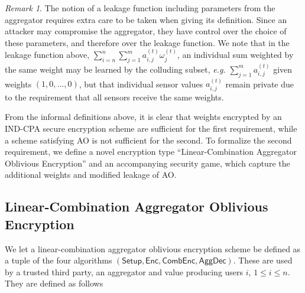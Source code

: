 \documentclass[10pt,letterpaper,oneside,twocolumn,journal]{IEEEtran}
\theoremstyle{definition}
\theoremstyle{definition}
\theoremstyle{remark}
\newtheorem*{remark}{Remark}
\begin{document}
\begin{remark} \label{rem:lcao_leakage}
    The notion of a leakage function including parameters from the aggregator requires extra care to be taken when giving its definition. Since an attacker may compromise the aggregator, they have control over the choice of these parameters, and therefore over the leakage function. We note that in the leakage function above, $\sum^n_{i=n}\sum^m_{j=1}a^{(t)}_{i,j}\omega^{(t)}_j$, an individual sum weighted by the same weight may be learned by the colluding subset, \textit{e.g.} $\sum^m_{j=1}a^{(t)}_{i,j}$ given weights $(1,0,\dots,0)$, but that individual sensor values $a^{(t)}_{i,j}$ remain private due to the requirement that all sensors receive the same weights.
\end{remark}

From the informal definitions above, it is clear that weights encrypted by an IND-CPA secure encryption scheme are sufficient for the first requirement, while a scheme satisfying AO is not sufficient for the second. To formalize the second requirement, we define a novel encryption type ``Linear-Combination Aggregator Oblivious Encryption'' and an accompanying security game, which capture the additional weights and modified leakage of AO.

% 
% 

\subsection{Linear-Combination Aggregator Oblivious Encryption} \label{subsec:lcao}
We let a linear-combination aggregator oblivious encryption scheme be defined as a tuple of the four algorithms $(\mathsf{Setup}, \mathsf{Enc}, \mathsf{CombEnc}, \mathsf{AggDec})$. These are used by a trusted third party, an aggregator and value producing users $i,\,1\leq i \leq n$. They are defined as follows
\end{document}
